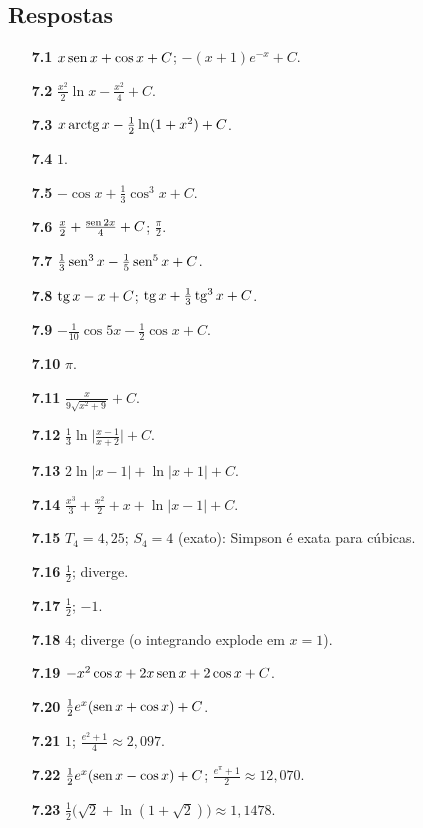 \subsection*{Respostas}
{\small\begin{multicols}{2}\raggedright
\begin{itemize}[leftmargin=2.7em,labelsep=0.5em,itemsep=1pt]
\item[\textbf{7.1}] $x\operatorname{sen} x+\cos x+C$; $-(x+1)e^{-x}+C$.
\item[\textbf{7.2}] $\tfrac{x^2}2\ln x-\tfrac{x^2}4+C$.
\item[\textbf{7.3}] $x\operatorname{arctg} x-\tfrac12\ln(1+x^2)+C$.
\item[\textbf{7.4}] $1$.
\item[\textbf{7.5}] $-\cos x+\tfrac13\cos^3x+C$.
\item[\textbf{7.6}] $\tfrac x2+\tfrac{\operatorname{sen}2x}4+C$; $\tfrac\pi2$.
\item[\textbf{7.7}] $\tfrac13\operatorname{sen}^3x-\tfrac15\operatorname{sen}^5x+C$.
\item[\textbf{7.8}] $\operatorname{tg} x-x+C$; $\operatorname{tg} x+\tfrac13\operatorname{tg}^3x+C$.
\item[\textbf{7.9}] $-\tfrac1{10}\cos5x-\tfrac12\cos x+C$.
\item[\textbf{7.10}] $\pi$.
\item[\textbf{7.11}] $\tfrac{x}{9\sqrt{x^2+9}}+C$.
\item[\textbf{7.12}] $\tfrac13\ln\Big|\tfrac{x-1}{x+2}\Big|+C$.
\item[\textbf{7.13}] $2\ln|x-1|+\ln|x+1|+C$.
\item[\textbf{7.14}] $\tfrac{x^3}3+\tfrac{x^2}2+x+\ln|x-1|+C$.
\item[\textbf{7.15}] $T_4=4{,}25$; $S_4=4$ (exato): Simpson é exata para cúbicas.
\item[\textbf{7.16}] $\tfrac12$; diverge.
\item[\textbf{7.17}] $\tfrac12$; $-1$.
\item[\textbf{7.18}] $4$; diverge (o integrando explode em $x=1$).
\item[\textbf{7.19}] $-x^2\cos x+2x\operatorname{sen} x+2\cos x+C$.
\item[\textbf{7.20}] $\tfrac12e^x(\operatorname{sen} x+\cos x)+C$.
\item[\textbf{7.21}] $1$; $\tfrac{e^2+1}4\approx2{,}097$.
\item[\textbf{7.22}] $\tfrac12e^x(\operatorname{sen} x-\cos x)+C$; $\tfrac{e^\pi+1}2\approx12{,}070$.
\item[\textbf{7.23}] $\tfrac12\big(\sqrt2+\ln(1+\sqrt2)\big)\approx1{,}1478$.

\end{itemize}
\end{multicols}}
